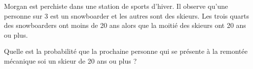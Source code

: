 
Morgan est perchiste dans une station de sports d'hiver. Il observe qu'une personne sur 3 est un snowboarder et les autres sont des skieurs. Les trois quarts des snowboarders ont moins de 20 ans alors que la moitié des skieurs ont 20 ans ou plus.

Quelle est la probabilité que la prochaine personne qui se présente à la remontée mécanique soi un skieur de 20 ans ou plus ?



